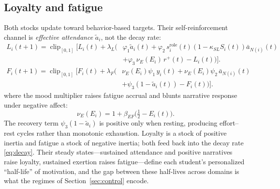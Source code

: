 \documentclass[11pt]{article}
\newcommand{\clip}{\operatorname{clip}_{[0,1]}}
\newcommand{\half}{\tfrac{1}{2}}
\begin{document}
\subsection{Loyalty and fatigue}\label{sec:loyalty}
Both stocks update toward behavior-based targets. Their self-reinforcement channel is \emph{effective attendance} $\tilde a_i$, not the decay rate:
\begin{equation}\tag{3}\label{eq:loyalty}
\begin{aligned}
L_i(t{+}1)=\clip\!\Big[L_i(t)+\lambda_L\big(&\varphi_1\tilde a_i(t)+\varphi_2\,s^{\mathrm{role}}_i(t)(1-\kappa_{SL}S_i(t))\bar a_{N(i)}(t)\\
&+\varphi_3\,\nu_E(E_i)\,r^+(t)-L_i(t)\big)\Big].
\end{aligned}
\end{equation}
\begin{equation}\tag{4}\label{eq:fatigue}
\begin{aligned}
F_i(t{+}1)=\clip\!\Big[F_i(t)+\lambda_F\big(&\nu_E(E_i)\psi_1\,y_i(t)+\nu_E(E_i)\psi_2\,\bar a_{N(i)}(t)\\
&+\psi_3(1-\tilde a_i(t))-F_i(t)\big)\Big].
\end{aligned}
\end{equation}
where the mood multiplier raises fatigue accrual and blunts narrative response under negative affect:
\begin{equation*}
\nu_E(E_i)=1+\beta_{EF}\big(\half-E_i(t)\big).
\end{equation*}
The recovery term $\psi_3(1-\tilde a_i)$ is positive only when resting, producing effort--rest cycles rather than monotonic exhaustion. Loyalty is a stock of positive inertia and fatigue a stock of negative inertia; both feed back into the decay rate \eqref{eq:decay}. Their steady states---sustained attendance and positive narratives raise loyalty, sustained exertion raises fatigue---define each student's personalized ``half-life'' of motivation, and the gap between these half-lives across domains is what the regimes of Section~\ref{sec:control} encode.
\end{document}
